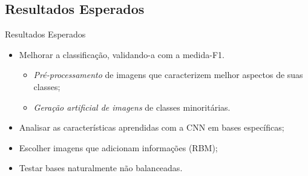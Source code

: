 \documentclass{beamer}
\begin{document}
\subsection{Resultados Esperados}
\begin{frame}{Resultados Esperados}
\setlength\leftmargini{0em}

\begin{itemize}
\item Melhorar a classificação, validando-a com a medida-F1. 
\begin{itemize}
\item \textit{Pré-processamento} de imagens que caracterizem melhor aspectos de suas classes;
\item \textit{Geração artificial de imagens} de classes minoritárias.
\end{itemize}
\item Analisar as características aprendidas com a CNN em bases específicas; 
\item Escolher imagens que adicionam informações (RBM);
\item Testar bases naturalmente não balanceadas.
\end{itemize}



\end{frame}
\end{document}
